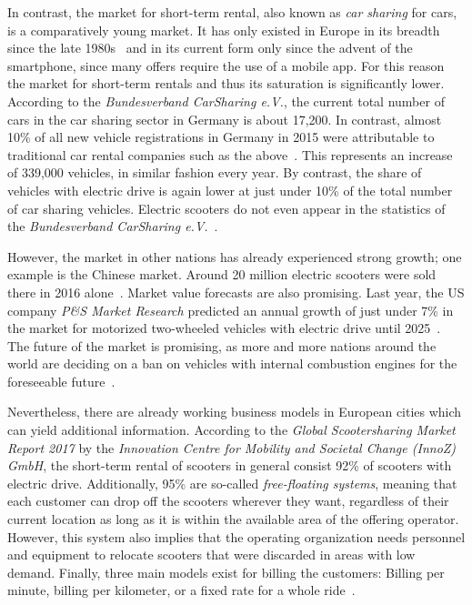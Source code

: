 \documentclass[12pt,a4paper,twoside]{report}
\begin{document}
In contrast, the market for short-term rental, also known as \textit{car sharing} for cars,
is a comparatively young market. It has only existed in Europe in its breadth
since the late 1980s~\cite{history-of-carsharing} and in its current form
only since the advent of the smartphone, since many offers require the use of a mobile app.
For this reason the market for short-term rentals and thus its saturation is significantly lower.
According to the \textit{Bundesverband CarSharing e.V.}, the current total number of cars
in the car sharing sector in Germany is about 17,200. In contrast, almost 10\% of all
new vehicle registrations in Germany in 2015 were attributable to traditional
car rental companies such as the above~\cite{sparkasse-kfz-vermietung}.
This represents an increase of 339,000 vehicles, in similar fashion every year.
By contrast, the share of vehicles with electric drive is again lower at
just under 10\% of the total number of car sharing vehicles.
Electric scooters do not even appear in the statistics of the
\textit{Bundesverband CarSharing e.V.}~\cite{bundesverband-carsharing-statistics}.

However, the market in other nations has already experienced strong growth;
one example is the Chinese market. Around 20 million electric scooters were sold
there in 2016 alone~\cite{heise-electric-scooters}. Market value forecasts are also promising.
Last year, the US company \textit{P\&S Market Research} predicted an annual growth of
just under 7\% in the market for motorized two-wheeled vehicles with
electric drive until 2025~\cite{pands-electric-scooters}.
The future of the market is promising, as more and more nations around the world
are deciding on a ban on vehicles with internal combustion engines for the
foreseeable future~\cite{faz-combustion-engine-ban}.

Nevertheless, there are already working business models in European cities
which can yield additional information.
According to the \textit{Global Scootersharing Market Report 2017} by the
\textit{Innovation Centre for Mobility and Societal Change (InnoZ) GmbH},
the short-term rental of scooters in general consist 92\% of scooters with
electric drive. Additionally, 95\% are so-called \textit{free-floating systems},
meaning that each customer can drop off the scooters wherever they want, regardless
of their current location as long as it is within the available area of the offering operator.
However, this system also implies that the operating organization needs personnel
and equipment to relocate scooters that were discarded in areas with low demand.
Finally, three main models exist for billing the customers:
Billing per minute, billing per kilometer, or a fixed rate for a whole ride~\cite{scootersharing-report}.
\end{document}
